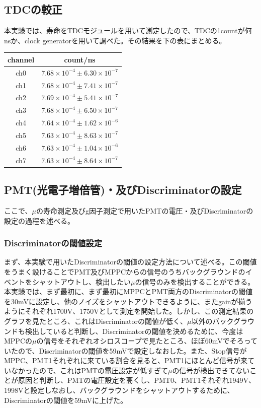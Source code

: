\subsection{TDCの較正}
本実験では、寿命をTDCモジュールを用いて測定したので、TDCの1countが何nsか、clock generatorを用いて調べた。その結果を下の表にまとめる。
\begin{center}
 \begin{tabular}{c|c} \hline
  channel & count/ns \\ \hline
      ch0 &  $7.68\times 10^{-4}\pm 6.30\times 10^{-7}$ \\
      ch1 &  $7.68\times 10^{-4}\pm 7.41\times 10^{-7}$ \\
      ch2 &  $7.69\times 10^{-4}\pm 5.41\times 10^{-7}$ \\
      ch3 &  $7.68\times 10^{-4}\pm 6.50\times 10^{-7}$ \\
      ch4 &  $7.64\times 10^{-4}\pm 1.62\times 10^{-6}$ \\
      ch5 &  $7.63\times 10^{-4}\pm 8.63\times 10^{-7}$ \\
      ch6 &  $7.63\times 10^{-4}\pm 1.04\times 10^{-6}$ \\
      ch7 &  $7.63\times 10^{-4}\pm 8.64\times 10^{-7}$ \\
 \end{tabular}
\end{center}
\subsection{PMT(光電子増倍管)・及びDiscriminatorの設定}
ここで、$\mu$の寿命測定及びg因子測定で用いたPMTの電圧・及びDiscriminatorの設定の過程を述べる。
\subsubsection{Discriminatorの閾値設定}
まず、本実験で用いたDiscriminatorの閾値の設定方法について述べる。この閾値をうまく設けることでPMT及びMPPCからの信号のうちバックグラウンドのイベントをシャットアウトし、検出したい$\mu$の信号のみを検出することができる。
本実験では、まず最初に、まず最初にMPPCとPMT両方のDiscriminatorの閾値を30mVに設定し、他のノイズをシャットアウトできるように、またgainが揃うようにそれぞれ1700V、1750Vとして測定を開始した。しかし、この測定結果のグラフを見たところ、これはDiscriminatorの閾値が低く、$\mu$以外のバックグラウンドも検出していると判断し、Discriminatorの閾値を決めるために、今度はMPPCの$\mu$の信号をそれぞれオシロスコープで見たところ、ほぼ60mVでそろっていたので、Discriminatorの閾値を59mVで設定しなおした。また、Stop信号がMPPC、PMT1それぞれに来ている割合を見ると、PMT1にほとんど信号が来ていなかったので、これはPMTの電圧設定が低すぎて$\mu$の信号が検出できてないことが原因と判断し、PMTの電圧設定を高くし、PMT0、PMT1それぞれ1949V、1998Vと設定しなおし、バックグラウンドをシャットアウトするために、Discriminatorの閾値を59mVに上げた。
